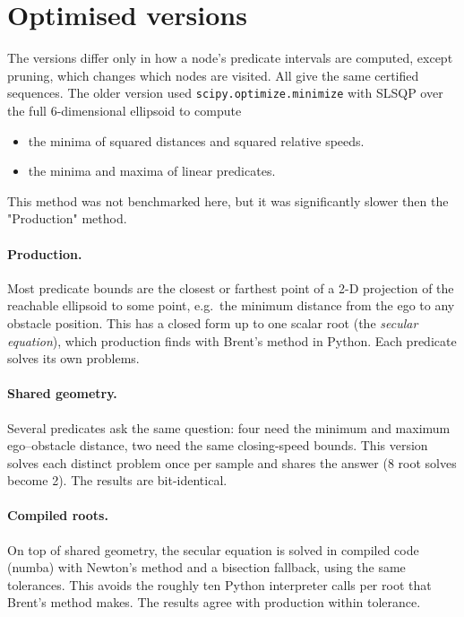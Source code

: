 \documentclass[11pt,a4paper]{article}
\begin{document}
\section{Optimised versions}

The versions differ only in how a node's predicate intervals are computed,
except pruning, which changes which nodes are visited. All give the same
certified sequences. The older version used \texttt{scipy.optimize.minimize} with SLSQP
over the full \(6\)-dimensional ellipsoid to compute
\begin{itemize}
    \item the minima of squared distances and squared relative speeds.
    \item the minima and maxima of linear predicates.
\end{itemize}
This method was not benchmarked here, but it was significantly slower then the "Production" method.

\paragraph{Production.} Most predicate bounds are the closest or farthest
point of a 2-D projection of the reachable ellipsoid to some point, e.g.\ the
minimum distance from the ego to any obstacle position. This has a closed form
up to one scalar root (the \emph{secular equation}), which production finds
with Brent's method in Python. Each predicate solves its own
problems.

\paragraph{Shared geometry.} Several predicates ask the same question: four
need the minimum and maximum ego--obstacle distance, two need the same
closing-speed bounds. This version solves each distinct problem once per
sample and shares the answer (8 root solves become 2). The results are
bit-identical.

\paragraph{Compiled roots.} On top of shared geometry, the secular equation is
solved in compiled code (numba) with Newton's method and a bisection fallback,
using the same tolerances. This avoids the roughly ten Python interpreter calls
per root that Brent's method makes. The results agree with production within tolerance.
\end{document}
